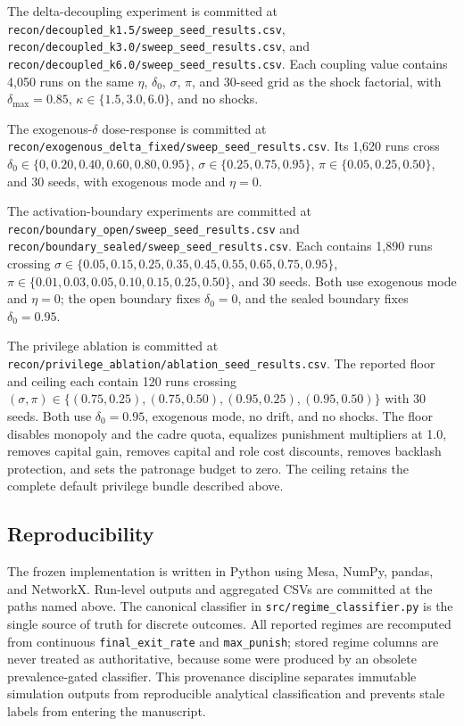 The delta-decoupling experiment is committed at \texttt{recon/decoupled\_k1.5/sweep\_seed\_results.csv}, \texttt{recon/decoupled\_k3.0/sweep\_seed\_results.csv}, and \texttt{recon/decoupled\_k6.0/sweep\_seed\_results.csv}. Each coupling value contains 4,050 runs on the same \(\eta\), \(\delta_0\), \(\sigma\), \(\pi\), and 30-seed grid as the shock factorial, with \(\delta_{\max}=0.85\), \(\kappa\in\{1.5,3.0,6.0\}\), and no shocks.

The exogenous-\(\delta\) dose-response is committed at \texttt{recon/exogenous\_delta\_fixed/sweep\_seed\_results.csv}. Its 1,620 runs cross \(\delta_0\in\{0,0.20,0.40,0.60,0.80,0.95\}\), \(\sigma\in\{0.25,0.75,0.95\}\), \(\pi\in\{0.05,0.25,0.50\}\), and 30 seeds, with exogenous mode and \(\eta=0\).

The activation-boundary experiments are committed at \texttt{recon/boundary\_open/sweep\_seed\_results.csv} and \texttt{recon/boundary\_sealed/sweep\_seed\_results.csv}. Each contains 1,890 runs crossing \(\sigma\in\{0.05,0.15,0.25,0.35,0.45,0.55,0.65,0.75,0.95\}\), \(\pi\in\{0.01,0.03,0.05,0.10,0.15,0.25,0.50\}\), and 30 seeds. Both use exogenous mode and \(\eta=0\); the open boundary fixes \(\delta_0=0\), and the sealed boundary fixes \(\delta_0=0.95\).

The privilege ablation is committed at \texttt{recon/privilege\_ablation/ablation\_seed\_results.csv}. The reported floor and ceiling each contain 120 runs crossing \((\sigma,\pi)\in\{(0.75,0.25),(0.75,0.50),(0.95,0.25),(0.95,0.50)\}\) with 30 seeds. Both use \(\delta_0=0.95\), exogenous mode, no drift, and no shocks. The floor disables monopoly and the cadre quota, equalizes punishment multipliers at 1.0, removes capital gain, removes capital and role cost discounts, removes backlash protection, and sets the patronage budget to zero. The ceiling retains the complete default privilege bundle described above.

\subsection{Reproducibility}

The frozen implementation is written in Python using Mesa, NumPy, pandas, and NetworkX. Run-level outputs and aggregated CSVs are committed at the paths named above. The canonical classifier in \texttt{src/regime\_classifier.py} is the single source of truth for discrete outcomes. All reported regimes are recomputed from continuous \texttt{final\_exit\_rate} and \texttt{max\_punish}; stored regime columns are never treated as authoritative, because some were produced by an obsolete prevalence-gated classifier. This provenance discipline separates immutable simulation outputs from reproducible analytical classification and prevents stale labels from entering the manuscript.
